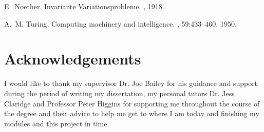 \documentclass[12pt, a4paper,oneside]{book}
\numberwithin{equation}{section}
\begin{document}
\begin{thebibliography}{999}

E.~Noether.
\newblock Invariante {V}ariationsprobleme.
, 1918.

A.~M. Turing.
\newblock Computing machinery and intelligence.
, 59:433--460, 1950.

\end{thebibliography}

\section*{Acknowledgements}
I would like to thank my supervisor Dr. Joe Bailey for his guidance and support during the period of writing my dissertation, my personal tutors Dr. Jess Claridge and Professor Peter Higgins for supporting me throughout the course of the degree and their advice to help me get to where I am today and finishing my modules and this project in time.
\end{document}
